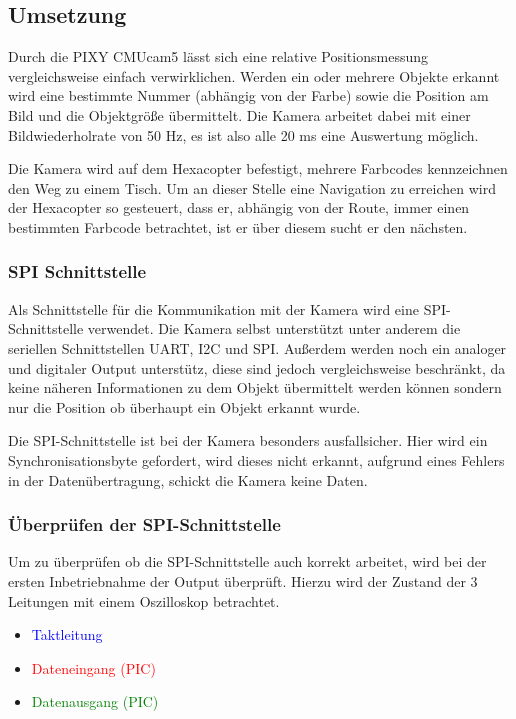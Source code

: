 
  \subsection{Umsetzung}
  Durch die PIXY CMUcam5 lässt sich eine relative Positionsmessung vergleichsweise einfach verwirklichen.
  Werden ein oder mehrere Objekte erkannt wird eine bestimmte Nummer (abhängig von der Farbe) sowie die Position am Bild und die Objektgröße übermittelt.
  Die Kamera arbeitet dabei mit einer Bildwiederholrate von 50 Hz, es ist also alle 20 ms eine Auswertung möglich.

  Die Kamera wird auf dem Hexacopter befestigt, mehrere Farbcodes kennzeichnen den Weg zu einem Tisch.
  Um an dieser Stelle eine Navigation zu erreichen wird der Hexacopter so gesteuert, dass er, abhängig von der Route,
  immer einen bestimmten Farbcode betrachtet, ist er über diesem sucht er den nächsten.

    \subsubsection{SPI Schnittstelle}
    Als Schnittstelle für die Kommunikation mit der Kamera wird eine SPI-Schnittstelle verwendet.
    Die Kamera selbst unterstützt unter anderem die seriellen Schnittstellen UART, I2C und SPI.
    Außerdem werden noch ein analoger und digitaler Output unterstütz, diese sind jedoch vergleichsweise beschränkt,
    da keine näheren Informationen zu dem Objekt übermittelt werden können sondern nur die Position \bzw ob überhaupt ein Objekt erkannt wurde.

    Die SPI-Schnittstelle ist bei der Kamera besonders ausfallsicher. Hier wird ein Synchronisationsbyte gefordert, wird dieses nicht erkannt,
    \zB aufgrund eines Fehlers in der Datenübertragung, schickt die Kamera keine Daten.

    \subsubsection*{Überprüfen der SPI-Schnittstelle}
    Um zu überprüfen ob die SPI-Schnittstelle auch korrekt arbeitet, wird bei der ersten Inbetriebnahme der Output überprüft.
    Hierzu wird der Zustand der 3 Leitungen mit einem Oszilloskop betrachtet.
    \begin{itemize}
      \item \textcolor{blue}{Taktleitung}
      \item \textcolor{red}{Dateneingang (PIC)}
      \item \textcolor{green}{Datenausgang (PIC)}
    \end{itemize}

